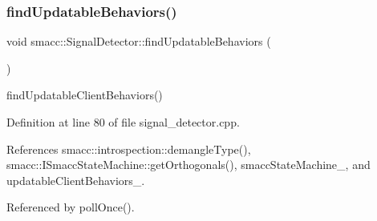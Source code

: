 \subsubsection{\texorpdfstring{find\+Updatable\+Behaviors()}{findUpdatableBehaviors()}}
{\footnotesize\ttfamily void smacc\+::\+Signal\+Detector\+::find\+Updatable\+Behaviors (\begin{DoxyParamCaption}{ }\end{DoxyParamCaption})\hspace{0.3cm}{\ttfamily [private]}}

find\+Updatable\+Client\+Behaviors() 

Definition at line 80 of file signal\+\_\+detector.\+cpp.



References smacc\+::introspection\+::demangle\+Type(), smacc\+::\+I\+Smacc\+State\+Machine\+::get\+Orthogonals(), smacc\+State\+Machine\+\_\+, and updatable\+Client\+Behaviors\+\_\+.



Referenced by poll\+Once().


